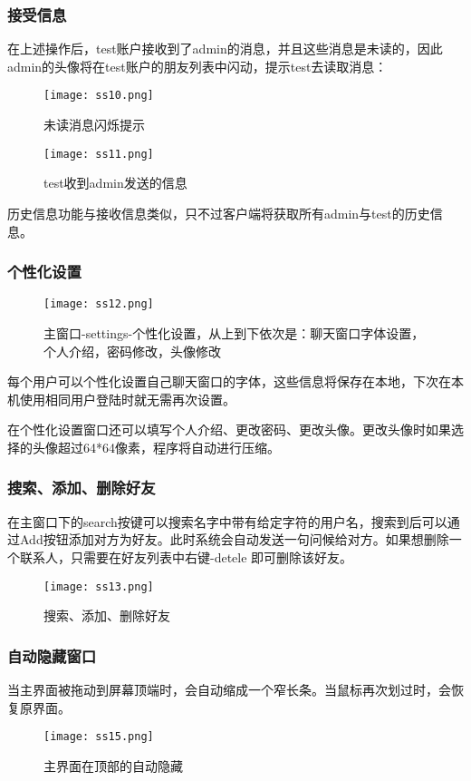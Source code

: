 \documentclass[a4paper,11pt]{article}
\begin{document}
        \subsubsection{接受信息}
            在上述操作后，test账户接收到了admin的消息，并且这些消息是未读的，因此admin的头像将在test账户的朋友列表中闪动，提示test去读取消息：\par
             \begin{figure}[H]
                \centering
                \texttt{[image: ss10.png]}
                \caption{未读消息闪烁提示}
            \end{figure}
            \begin{figure}[H]
                \centering
                \texttt{[image: ss11.png]}
                \caption{test收到admin发送的信息}
            \end{figure}
            历史信息功能与接收信息类似，只不过客户端将获取所有admin与test的历史信息。
        \subsubsection{个性化设置}
            \begin{figure}[H]
                \centering
                \texttt{[image: ss12.png]}
                \caption{主窗口-settings-个性化设置，从上到下依次是：聊天窗口字体设置，个人介绍，密码修改，头像修改}
            \end{figure}
            每个用户可以个性化设置自己聊天窗口的字体，这些信息将保存在本地，下次在本机使用相同用户登陆时就无需再次设置。\par
            在个性化设置窗口还可以填写个人介绍、更改密码、更改头像。更改头像时如果选择的头像超过64*64像素，程序将自动进行压缩。
        \subsubsection{搜索、添加、删除好友}
            在主窗口下的search按键可以搜索名字中带有给定字符的用户名，搜索到后可以通过Add按钮添加对方为好友。此时系统会自动发送一句问候给对方。如果想删除一个联系人，只需要在好友列表中右键-detele 即可删除该好友。\par
             \begin{figure}[H]
                \centering
                \texttt{[image: ss13.png]}
                \caption{搜索、添加、删除好友}
            \end{figure}
        \subsubsection{自动隐藏窗口}
            当主界面被拖动到屏幕顶端时，会自动缩成一个窄长条。当鼠标再次划过时，会恢复原界面。
            \begin{figure}[H]
                \centering
                \texttt{[image: ss15.png]}
                \caption{主界面在顶部的自动隐藏}
            \end{figure}
\end{document}
